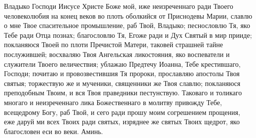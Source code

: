 \begin{mymulticols}

Владыко
Господи Иисусе Христе Боже мой, иже неизреченнаго ради Твоего человеколюбия на конец веков во плоть оболкийся от Приснодевы Марии, славлю о мне Твое спасительное промышление, раб Твой, Владыко;
песнословлю Тя, яко Тебе ради Отца познах; благословлю Тя, Егоже ради и Дух Святый в мир прииде; покланяюся Твоей по плоти Пречистой Матери, таковей страшней тайне послужившей; восхваляю Твоя Ангельская ликостояния, яко воспеватели и служители Твоего величествия; ублажаю Предтечу Иоанна, Тебе крестившаго, Господи; почитаю и провозвестившия Тя пророки, прославляю апостолы Твоя святыя; торжествую же и мученики, священники же Твоя славлю; покланяюся преподобным Твоим, и вся Твоя праведники пестунствую. Таковаго и толикаго многаго и неизреченнаго лика Божественнаго в молитву привожду Тебе, всещедрому Богу, раб Твой, и сего ради прошу моим согрешением прощения, еже даруй ми всех Твоих ради святых, изряднее же святых Твоих щедрот, яко благословен еси во веки. Аминь.


\end{mymulticols}

\mychapterending


